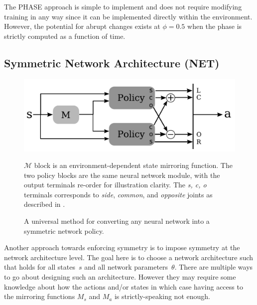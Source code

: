 The PHASE approach is simple to implement and does not require modifying training in any way 
since it can be implemented directly within the environment. 
However, the potential for abrupt changes exists at $\phi=0.5$ when the 
phase is strictly computed as a function of time.

\subsection{Symmetric Network Architecture (NET)}

\begin{figure}%
  \centering
  \includegraphics[width=0.9\columnwidth]{symmetry_figures/net_architecture_2.pdf}
  \caption{A universal method for converting any neural network into a symmetric network policy.}{$\mathcal{M}$ block is an environment-dependent state mirroring function. The two policy blocks are the same neural network module, with the output terminals re-order for illustration clarity.  The \textit{s, c, o} terminals corresponds to \textit{side}, \textit{common}, and \textit{opposite} joints as described in .}
  \label{fig:net-architecture}
\end{figure}

Another approach towards enforcing symmetry is to impose symmetry at the network architecture level. 
The goal here is to choose a network architecture such that  
holds for all states~$s$ and all network parameters~$\theta$.
There are multiple ways to go about designing such an architecture.
However they may require some knowledge about how the actions and/or states 
in which case having access to the mirroring functions $M_s$ and $M_a$ is strictly-speaking not enough.

